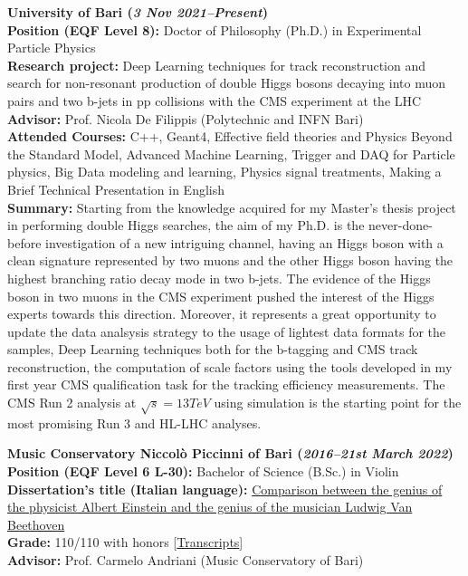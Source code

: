 \documentclass[11pt]{res}
\begin{document}
\begin{resume}
\textbf{University of Bari (\textit{3 Nov 2021--Present})}\\
\textbf{Position (EQF Level 8):} Doctor of Philosophy (Ph.D.) in Experimental Particle Physics\\
\textbf{Research project:}
Deep Learning techniques for track reconstruction and search for non-resonant production of double Higgs bosons decaying into muon pairs and two b-jets in pp collisions with the CMS experiment at the LHC\\
\textbf{Advisor:} Prof. Nicola De Filippis (Polytechnic and INFN Bari)\\
\textbf{Attended Courses:} C++, Geant4, Effective field theories and Physics Beyond the Standard Model, Advanced Machine Learning, Trigger and DAQ for Particle physics, Big Data modeling and learning, Physics signal treatments, Making a Brief Technical Presentation in English\\
\textbf{Summary:} Starting from the knowledge acquired for my Master's thesis project in performing double Higgs searches, the aim of my Ph.D. is the never-done-before investigation of a new intriguing channel, having an Higgs boson with a clean signature represented by two muons and the other Higgs boson having the highest branching ratio decay mode in two b-jets. The evidence of the Higgs boson in two muons in the CMS experiment pushed the interest of the Higgs experts towards this direction. Moreover, it represents a great opportunity to update the data analsysis strategy to the usage of lightest data formats for the samples, Deep Learning techniques both for the b-tagging and CMS track reconstruction, the computation of scale factors using the tools developed in my first year CMS qualification task for the tracking efficiency measurements. The CMS Run 2 analysis at $\sqrt{s} = 13 TeV$ using simulation is the starting point for the most promising Run 3 and HL-LHC analyses. 

\textbf{Music Conservatory Niccolò Piccinni of Bari (\textit{2016--21st March 2022})}\\
\textbf{Position (EQF Level 6 L-30):} Bachelor of Science (B.Sc.) in Violin\\
\textbf{Dissertation's title (Italian language):}
\href{https://drive.google.com/file/d/1D4PbAL-X92U5CsQO8JGemSHA03GEtdu0/view?usp=share_link}{Comparison between the genius of the physicist Albert Einstein and the genius of the musician Ludwig Van Beethoven}\\
\textbf{Grade:} 110/110 with honors [\href{https://drive.google.com/file/d/1aV1ERPqgSpQ-9SRbWIpw-Q4BkuS1kvyy/view?usp=share_link}{Transcripts}]\\
\textbf{Advisor:} Prof. Carmelo Andriani (Music Conservatory of Bari)


\end{resume}
\end{document}
